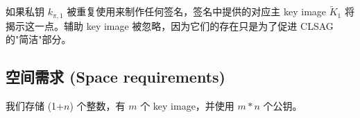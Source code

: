 如果私钥 \(k_{\pi, 1}\) 被重复使用来制作任何签名，签名中提供的对应主 key image \(\tilde{K}_1\) 将揭示这一点。辅助 key image 被忽略，因为它们的存在只是为了促进 CLSAG 的"简洁"部分。


\subsection*{空间需求 (Space requirements)}

我们存储 (1+$n$) 个整数，有 $m$ 个 key image，并使用 $m*n$ 个公钥。

